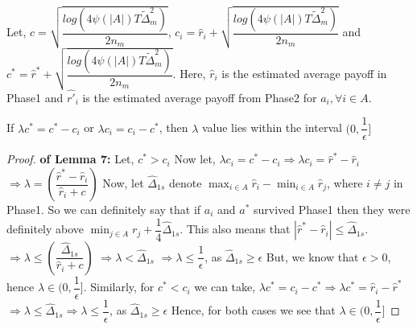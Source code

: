 Let, $c=\sqrt{\dfrac{log({4\psi(|A|)T\tilde{\Delta}_{m}^{2}})}{2n_{m}}}$, $c_{i}= \hat{r}_{i} + \sqrt{\dfrac{log({4\psi(|A|)T\tilde{\Delta}_{m}^{2}})}{2n_{m}}}$ and
$c^{*}= \hat{r}^{*} + \sqrt{\dfrac{log({4\psi(|A|)T\tilde{\Delta}_{m}^{2}})}{2n_{m}}}$.
\newline Here, $\hat{r}_{i}$ is the estimated average payoff in Phase1 and $\hat{r'}_{i}$ is the estimated average payoff from Phase2 for $a_{i}, \forall i \in A$.

\begin{lemma}
If $\lambda c^{*}=c^{*}-c_{i}$ or $\lambda c_{i}= c_{i} - c^{*}$, then $\lambda$ value lies within the interval $(0, \dfrac{1}{\epsilon}]$
\end{lemma}

\begin{proof}\textbf{ of Lemma 7:}
Let, $c^{*}>c_{i}$
\newline
Now let, $\lambda c_{i}= c^{*}-c_{i}\Rightarrow \lambda c_{i} = \hat{r}^{*} -\hat{r}_{i}$
\newline
\hspace*{11em}$\Rightarrow \lambda = (\dfrac{\hat{r}^{*} - \hat{r}_{i}}{\hat{r}_{i}+c})$
\newline
Now, let $\hat{\Delta}_{1s}$ denote $\max_{i\in A}{\hat{r}_{i}}-\min_{i\in A}{\hat{r}_{j}}$, where $i\neq j$ in Phase1. So we can definitely say that if $a_{i}$ and $a^{*}$ survived Phase1 then they were definitely above $\min_{j\in A}r_{j}+\dfrac{1}{4}\hat{\Delta}_{1s}$. This also means that $|\hat{r}^{*} - \hat{r}_{i}|\leq \hat{\Delta}_{1s}$.
\newline 
\hspace*{11em}$\Rightarrow \lambda \leq (\dfrac{\hat{\Delta}_{1s}}{\hat{r}_{i}+c})$
\newline 
\hspace*{11em}$\Rightarrow \lambda < \hat{\Delta}_{1s}$
\newline 
\hspace*{11em}$\Rightarrow \lambda \leq \dfrac{1}{\epsilon}$, as $\hat{\Delta}_{1s}\geq \epsilon$
\newline 
But, we know that $\epsilon> 0 $, hence $\lambda\in (0, \dfrac{1}{\epsilon}]$.
\newline
Similarly, for $c^{*} < c_{i}$ we can take, 
\newline
\hspace*{11em}$\lambda c^{*}= c_{i} - c^{*}\Rightarrow \lambda c^{*} = \hat{r}_{i} -\hat{r}^{*}$
\newline
\hspace*{11em}$\Rightarrow \lambda \leq \hat{\Delta}_{1s}\Rightarrow \lambda \leq \dfrac{1}{\epsilon}$, as $\hat{\Delta}_{1s}\geq \epsilon$
\newline 
Hence, for both cases we see that $\lambda\in (0, \dfrac{1}{\epsilon}]$
\end{proof}

